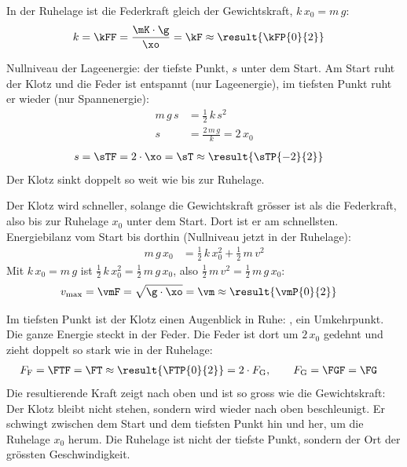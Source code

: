 \begin{abcliste}
\abc
In der Ruhelage ist die Federkraft gleich der Gewichtskraft, $k\,x_0 = m\,g$:
\begin{align}
 k &= \kFF = \frac{\mK\cdot\g}{\xo} = \kF \approx \result{\kFP{0}{2}}
\end{align}

\abc
Nullniveau der Lageenergie: der tiefste Punkt, $s$ unter dem Start. Am Start ruht der Klotz und die Feder ist entspannt (nur Lageenergie), im tiefsten Punkt ruht er wieder (nur Spannenergie):
\begin{align}
 m\,g\,s &= \frac{1}{2}\,k\,s^2 \\
 s &= \frac{2\,m\,g}{k} = 2\,x_0
\end{align}
\begin{align}
 s &= \sTF = 2\cdot\xo = \sT \approx \result{\sTP{-2}{2}}
\end{align}
Der Klotz sinkt doppelt so weit wie bis zur Ruhelage.

\abc
Der Klotz wird schneller, solange die Gewichtskraft grösser ist als die Federkraft, also bis zur Ruhelage $x_0$ unter dem Start. Dort ist er am schnellsten. Energiebilanz vom Start bis dorthin (Nullniveau jetzt in der Ruhelage):
\begin{align}
 m\,g\,x_0 &= \frac{1}{2}\,k\,x_0^2 + \frac{1}{2}\,m\,v^2
\end{align}
Mit $k\,x_0 = m\,g$ ist $\frac{1}{2}\,k\,x_0^2 = \frac{1}{2}\,m\,g\,x_0$, also $\frac{1}{2}\,m\,v^2 = \frac{1}{2}\,m\,g\,x_0$:
\begin{align}
 v_\mathrm{max} &= \vmF = \sqrt{\g\cdot\xo} = \vm \approx \result{\vmP{0}{2}}
\end{align}

\abc
Im tiefsten Punkt ist der Klotz einen Augenblick in Ruhe: , ein Umkehrpunkt. Die ganze Energie steckt in der Feder. Die Feder ist dort um $2\,x_0$ gedehnt und zieht doppelt so stark wie in der Ruhelage:
\begin{align}
 F_\mathrm{F} &= \FTF = \FT \approx \result{\FTP{0}{2}} = 2\cdot F_\mathrm{G}, \qquad F_\mathrm{G} = \FGF = \FG
\end{align}
Die resultierende Kraft zeigt nach oben und ist so gross wie die Gewichtskraft: Der Klotz bleibt nicht stehen, sondern wird wieder nach oben beschleunigt. Er schwingt zwischen dem Start und dem tiefsten Punkt hin und her, um die Ruhelage $x_0$ herum. Die Ruhelage ist nicht der tiefste Punkt, sondern der Ort der grössten Geschwindigkeit.
\end{abcliste}
